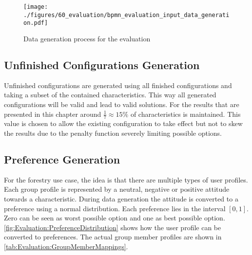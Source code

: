 \begin{figure}[htb]
    \centering
    \texttt{[image: ./figures/60\_evaluation/bpmn\_evaluation\_input\_data\_generation.pdf]}
    \caption[Data Generation Process]{Data generation process for the evaluation}
    \label{fig:Evaluation:GeneratingDataProcess}
\end{figure}

\subsection{Unfinished Configurations Generation}

Unfinished configurations are generated using all finished configurations and taking a subset of the contained characteristics. This way all generated configurations will be valid and lead to valid solutions. For the results that are presented in this chapter around $\frac{1}{7} \approx 15\%$ of characteristics is maintained. This value is chosen to allow the existing configuration to take effect but not to skew the results due to the penalty function severely limiting possible options.

\subsection{Preference Generation}

For the forestry use case, the idea is that there are multiple types of user profiles. Each group profile is represented by a neutral, negative or positive attitude towards a characteristic. During data generation the attitude is converted to a preference using a normal distribution. Each preference lies in the interval $[0,1]$. Zero can be seen as worst possible option and one as best possible option. \autoref{fig:Evaluation:PreferenceDistribution} shows how the user profile can be converted to preferences. The actual group member profiles are shown in \autoref{tab:Evaluation:GroupMemberMappings}.

